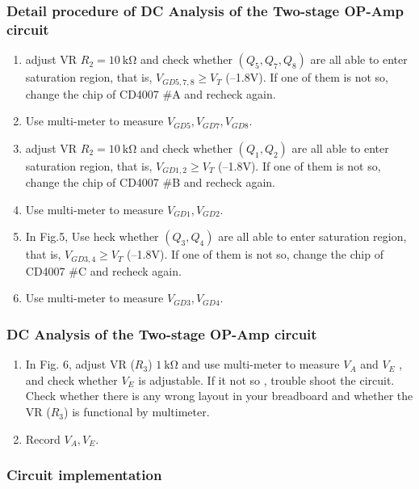 \documentclass[12pt, a4paper]{article}
\begin{document}
\subsubsection{Detail procedure of DC Analysis 
of the Two-stage OP-Amp circuit }
\begin{enumerate}[itemsep=0pt]
  \item  adjust VR $R_2 = \SI{10}\kohm$ and check whether $(Q_5 , Q_7 , Q_8)$ are all 
    able to enter saturation region, that is, $V_{GD5,7,8} \geq V_T$ 
      (–1.8V). If one of them is not so, change the chip
       of CD4007 \#A and recheck again. 
  \item  Use multi-meter to measure $V_{GD5},V_{GD7},V_{GD8}$.
  \item  adjust VR $R_2 = \SI{10}\kohm$ and check whether $(Q_1, Q_2)$ are all 
    able to enter saturation region, that is, $V_{GD1,2} \geq V_T$ 
      (–1.8V). If one of them is not so, change the chip
      of CD4007 \#B and recheck again. 
  \item  Use multi-meter to measure $V_{GD1},V_{GD2}$.
  \item  In Fig.5, Use heck whether $(Q_3, Q_4)$ are all 
    able to enter saturation region, that is, $V_{GD3,4} \geq V_T$ 
      (–1.8V). If one of them is not so, change the chip
       of CD4007 \#C and recheck again. 
  \item  Use multi-meter to measure $V_{GD3},V_{GD4}$.
\end{enumerate}

\subsubsection{DC Analysis of the Two-stage OP-Amp circuit}

\begin{enumerate}[itemsep=0pt]
  \item In Fig. 6, adjust VR ($R_3$) $\SI{1}\kohm$ and use multi-meter to measure 
     $V_A$ and $V_E$ , and check whether $V_E$ is adjustable. If it not so
       , trouble shoot the circuit. 
       Check whether there is any wrong layout in your breadboard and 
       whether the VR ($R_3$) is functional by multimeter. 
  \item Record $V_A, V_E$.
\end{enumerate}

\subsubsection{Circuit implementation}
\end{document}
